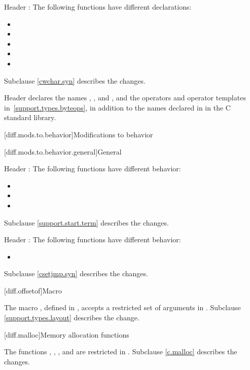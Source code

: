 \pnum
Header :
The following functions have different declarations:

\begin{itemize}
\item {}
\item {}
\item {}
\item {}
\item {}
\end{itemize}

Subclause \ref{cwchar.syn} describes the changes.

\pnum
Header 
declares the names , , and ,
and the operators and operator templates in~\ref{support.types.byteops},
in addition to the names declared in
 in the C standard library.

[diff.mods.to.behavior]{Modifications to behavior}

[diff.mods.to.behavior.general]{General}

\pnum
Header :
The following functions have different behavior:

\begin{itemize}
\item {}
\item {}
\item {}
\end{itemize}

Subclause \ref{support.start.term} describes the changes.

\pnum
Header :
The following functions have different behavior:
\begin{itemize}
\item {}
\end{itemize}

Subclause \ref{csetjmp.syn} describes the changes.

[diff.offsetof]{Macro }
%

\pnum
The macro , defined in
,
accepts a restricted set of  arguments in \Cpp{}.
Subclause \ref{support.types.layout} describes the change.

[diff.malloc]{Memory allocation functions}

\pnum
The functions
,
,
,
and
are restricted in \Cpp{}.
Subclause \ref{c.malloc} describes the changes.

